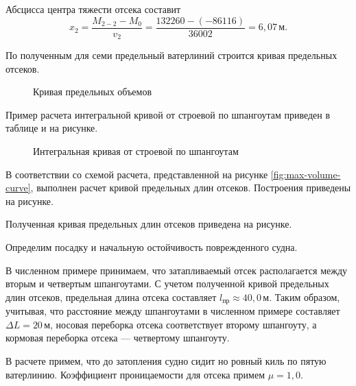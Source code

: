 Абсцисса центра тяжести отсека составит
\begin{equation*}
    x_2 = \frac{M_{2-2} - M_0}{v_2} = \frac{132260 - (-86116)}{36002} = 6{,}07\,\text{м}.
\end{equation*}

По полученным для семи предельный ватерлиний  строится кривая предельных отсеков.

\begin{figure}[H]
    \centerline{}
    \caption{Кривая предельных объемов}
\end{figure}

Пример расчета интегральной кривой от строевой по шпангоутам приведен в таблице и на рисунке.

\begin{figure}[H]
    \centerline{}
    \caption{Интегральная кривая от строевой по шпангоутам}
\end{figure}

В соответствии со схемой расчета, представленной на рисунке \ref{fig:max-volume-curve}, выполнен расчет кривой предельных длин отсеков.
Построения приведены на рисунке.

\begin{figure}[H]
    \centerline{}
    \caption{К определению предельных длин отсеков}
    \caption*{\textit{
    }}
\end{figure}

Полученная кривая предельных длин отсеков приведена на рисунке.

\begin{figure}[H]
    \centerline{}
    \caption{Кривая предельных длин отсеков}
    \caption*{\textit{
    }}
\end{figure}

Определим посадку и начальную остойчивость поврежденного судна.

В численном примере принимаем, что затапливаемый отсек располагается между вторым и четвертым шпангоутами.
С учетом полученной кривой предельных длин отсеков, предельная длина отсека составляет $l_{\text{пр}} \approx 40{,}0\,\text{м}$.
Таким образом, учитывая, что расстояние между шпангоутами в численном примере составляет $\Delta L = 20\,\text{м}$, носовая переборка отсека соответствует второму шпангоуту, а кормовая переборка отсека --- четвертому шпангоуту.

В расчете примем, что до затопления судно сидит но ровный киль по пятую ватерлинию. Коэффициент проницаемости для отсека примем $\mu = 1{,}0$.

